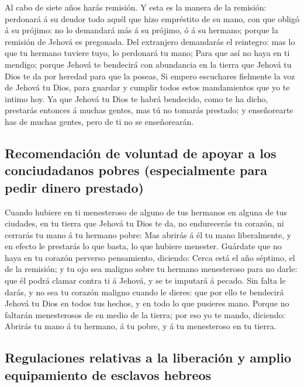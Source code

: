  Al cabo de siete años harás remisión.  Y esta
es la manera de la remisión: perdonará á su deudor todo aquél que hizo
empréstito de su mano, con que obligó á su prójimo: no lo demandará más
á su prójimo, ó á su hermano; porque la remisión de Jehová es pregonada.
 Del extranjero demandarás el reintegro: mas lo que tu
hermano tuviere tuyo, lo perdonará tu mano;  Para que así no
haya en ti mendigo; porque Jehová te bendecirá con abundancia en la
tierra que Jehová tu Dios te da por heredad para que la poseas,
 Si empero escuchares fielmente la voz de Jehová tu Dios,
para guardar y cumplir todos estos mandamientos que yo te intimo hoy.
 Ya que Jehová tu Dios te habrá bendecido, como te ha dicho,
prestarás entonces á muchas gentes, mas tú no tomarás prestado; y
enseñorearte has de muchas gentes, pero de ti no se enseñorearán.

\hypertarget{recomendaciuxf3n-de-voluntad-de-apoyar-a-los-conciudadanos-pobres-especialmente-para-pedir-dinero-prestado}{%
\subsection{Recomendación de voluntad de apoyar a los conciudadanos
pobres (especialmente para pedir dinero
prestado)}\label{recomendaciuxf3n-de-voluntad-de-apoyar-a-los-conciudadanos-pobres-especialmente-para-pedir-dinero-prestado}}

 Cuando hubiere en ti menesteroso de alguno de tus hermanos
en alguna de tus ciudades, en tu tierra que Jehová tu Dios te da, no
endurecerás tu corazón, ni cerrarás tu mano á tu hermano pobre:
 Mas abrirás á él tu mano liberalmente, y en efecto le
prestarás lo que basta, lo que hubiere menester.  Guárdate
que no haya en tu corazón perverso pensamiento, diciendo: Cerca está el
año séptimo, el de la remisión; y tu ojo sea maligno sobre tu hermano
menesteroso para no darle: que él podrá clamar contra ti á Jehová, y se
te imputará á pecado.  Sin falta le darás, y no sea tu
corazón maligno cuando le dieres: que por ello te bendecirá Jehová tu
Dios en todos tus hechos, y en todo lo que pusieres mano. 
Porque no faltarán menesterosos de en medio de la tierra; por eso yo te
mando, diciendo: Abrirás tu mano á tu hermano, á tu pobre, y á tu
menesteroso en tu tierra.

\hypertarget{regulaciones-relativas-a-la-liberaciuxf3n-y-amplio-equipamiento-de-esclavos-hebreos}{%
\subsection{Regulaciones relativas a la liberación y amplio equipamiento
de esclavos
hebreos}\label{regulaciones-relativas-a-la-liberaciuxf3n-y-amplio-equipamiento-de-esclavos-hebreos}}

